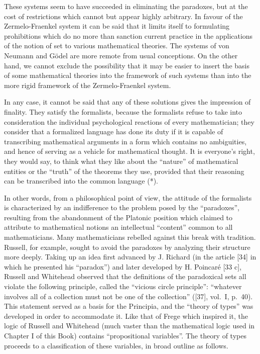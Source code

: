 These systems seem to have succeeded in eliminating the paradoxes, but at the cost of restrictions which cannot but appear highly arbitrary. In favour of the Zermelo-Fraenkel system it can be said that it limits itself to formulating prohibitions which do no more than sanction current practice in the applications of the notion of set to various mathematical theories. The systems of von Neumann and Gödel are more remote from usual conceptions. On the other hand, we cannot exclude the possibility that it may be easier to insert the basis of some mathematical theories into the framework of such systems than into the more rigid framework of the Zermelo-Fraenkel system.

In any case, it cannot be said that any of these solutions gives the impression of finality. They satisfy the formalists, because the formalists refuse to take into consideration the individual psychological reactions of every mathematician; they consider that a formalized language has done its duty if it is capable of transcribing mathematical arguments in a form which contains no ambiguities, and hence of serving as a vehicle for mathematical thought. It is everyone's right, they would say, to think what they like about the ``nature'' of mathematical entities or the ``truth'' of the theorems they use, provided that their reasoning can be transcribed into the common language (*).

In other words, from a philosophical point of view, the attitude of the formalists is characterized by an indifference to the problem posed by the ``paradoxes'', resulting from the abandonment of the Platonic position which claimed to attribute to mathematical notions an intellectual ``content'' common to all mathematicians. Many mathematicians rebelled against this break with tradition. Russell, for example, sought to avoid the paradoxes by analyzing their structure more deeply. Taking up an idea first advanced by J. Richard (in the article {[}34{]} in which he presented his ``paradox'') and later developed by H. Poincaré {[}33 c{]}, Russell and Whitehead observed that the definitions of the paradoxical sets all violate the following principle, called the ``vicious circle principle'': ``whatever involves all of a collection must not be one of the collection'' ({[}37{]}, vol.~I, p.~40). This statement served as a basis for the Principia, and the ``theory of types'' was developed in order to accommodate it. Like that of Frege which inspired it, the logic of Russell and Whitehead (much vaster than the mathematical logic used in Chapter I of this Book) contains ``propositional variables''. The theory of types proceeds to a classification of these variables, in broad outline as follows.

